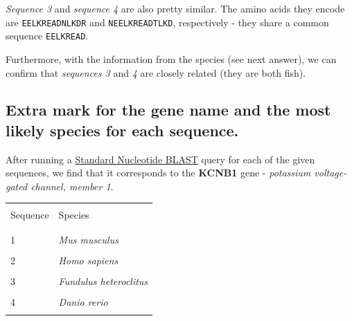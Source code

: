 \textit{Sequence 3} and \textit{sequence 4} are also pretty similar. The amino acids they encode are \texttt{EELKREADNLKDR} and \texttt{NEELKREADTLKD}, respectively - they share a common sequence \texttt{EELKREAD}.

Furthermore, with the information from the species (see next answer), we can confirm that \textit{sequences 3} and \textit{4} are closely related (they are both fish).

\medskip


\subsection{Extra mark for the gene name and the most likely species for each sequence.}

After running a \href{https://blast.ncbi.nlm.nih.gov/Blast.cgi?PROGRAM=blastn&PAGE_TYPE=BlastSearch&LINK_LOC=blasthome}{Standard Nucleotide BLAST} query for each of the given sequences, we find that it corresponds to the \textbf{KCNB1} gene - \textit{potassium voltage-gated channel, member 1}.

\bigskip

\begin{center}
	\begin{tabu} to 0.8\textwidth{ | X[c] | X[c] | }
		\hline
		& \\
		Sequence & Species \\
		& \\
		\hline
		& \\
		1 & \textit{Mus musculus} \\
		& \\
		2 & \textit{Homo sapiens} \\
		& \\
		3 & \textit{Fundulus heteroclitus} \\
		& \\
		4 & \textit{Danio rerio} \\
		& \\
		\hline
	\end{tabu}
\end{center}

\newpage
